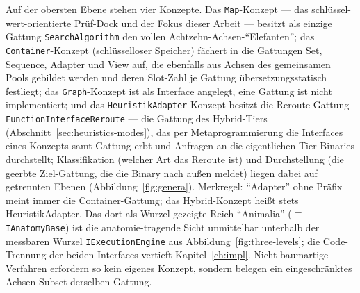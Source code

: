 \begin{nurlang}
Auf der obersten Ebene stehen vier Konzepte. Das \texttt{Map}-Konzept --- das
schlüssel-wert-orientierte Prüf-Dock und der Fokus dieser Arbeit --- besitzt als einzige Gattung
\texttt{SearchAlgorithm} den vollen Achtzehn-Achsen-\enquote{Elefanten}; das \texttt{Container}-Konzept
(schlüsselloser Speicher) fächert in die Gattungen Set, Sequence, Adapter und View auf, die ebenfalls aus
Achsen des gemeinsamen Pools gebildet werden und deren Slot-Zahl je Gattung übersetzungsstatisch
festliegt; das \texttt{Graph}-Konzept ist als Interface angelegt, eine Gattung ist nicht implementiert; und
das \texttt{HeuristikAdapter}-Konzept besitzt die Reroute-Gattung \texttt{FunctionInterfaceReroute} --- die
Gattung des Hybrid-Tiers (Abschnitt~\ref{sec:heuristics-modes}), das per Metaprogrammierung die
Interfaces eines Konzepts samt Gattung erbt und Anfragen an die eigentlichen Tier-Binaries durchstellt;
Klassifikation (welcher Art das Reroute ist) und Durchstellung (die geerbte Ziel-Gattung, die die Binary
nach außen meldet) liegen dabei auf getrennten Ebenen (Abbildung~\ref{fig:genera}). Merkregel:
\enquote{Adapter} ohne Präfix meint immer die Container-Gattung; das Hybrid-Konzept heißt stets
HeuristikAdapter. Das dort als Wurzel gezeigte Reich \enquote{Animalia} ($\equiv$ \texttt{IAnatomyBase})
ist die anatomie-tragende Sicht unmittelbar unterhalb der messbaren Wurzel \texttt{IExecutionEngine} aus
Abbildung~\ref{fig:three-levels}; die Code-Trennung der beiden Interfaces vertieft Kapitel~\ref{ch:impl}.
Nicht-baumartige Verfahren erfordern so kein eigenes Konzept, sondern belegen ein eingeschränktes
Achsen-Subset derselben Gattung.
\begin{figure}[htbp]\centering
\end{figure}
\end{nurlang}
